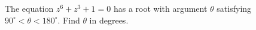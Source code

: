 The equation $z^6+z^3+1=0$ has a root with argument $\theta$ satisfying $90^\circ<\theta<180^\circ$. Find $\theta$ in degrees.

